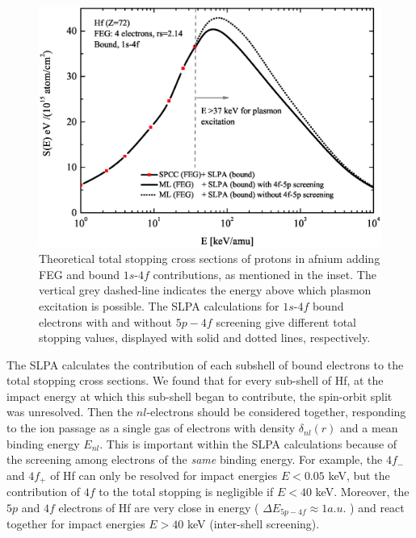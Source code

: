 \documentclass[aps,prb,reprint,groupedaddress]{revtex4-1}
\begin{document}
\begin{figure}[!t]
\centering
\includegraphics[width=13.cm]{Fig02.eps}
\caption{Theoretical total stopping cross sections of protons in afnium adding FEG and bound $1s$-$4f$ contributions, as mentioned in the inset. The vertical grey dashed-line indicates the energy above which plasmon excitation is possible. %
The SLPA calculations for $1s$-$4f$ bound electrons with and without $5p-4f$ screening give different total stopping values, displayed with solid and dotted lines, respectively.}
\label{slpa4f}
\end{figure}

The SLPA calculates the contribution of each subshell of bound electrons to the total stopping cross sections. We found that for every sub-shell of Hf, at the impact energy at which this sub-shell began to contribute, the spin-orbit split was unresolved.  Then the $nl$-electrons should be considered together, responding to the ion passage as a single gas of electrons with density $\delta_{nl}(r)$ and a mean binding energy $E_{nl}$. This is important within the SLPA calculations because of the screening among electrons of the \textit{same} binding energy. For example, the $4f_{-}$ and $4f_{+}$ of Hf can only be resolved for impact energies $E<0.05$ keV, but the contribution of $4f$ to the total stopping is negligible if $E<40$ keV. Moreover, the $5p$ and $4f$ electrons of Hf are very close in energy ( $\Delta E_{5p-4f} \approx 1 a.u.$ \cite{mendez2019}) %
and react together for impact energies $E>40$ keV (inter-shell screening).
\end{document}
